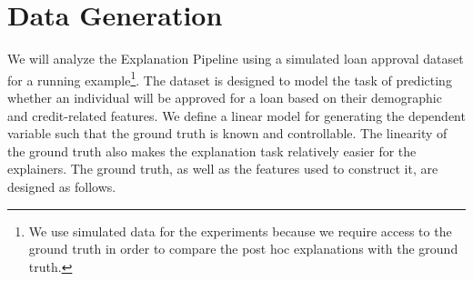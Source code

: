 \documentclass[12pt]{article}  %
\begin{document}

\vspace{-3mm}
\section{Data Generation}
\label{sec:data_generation}\vspace{-3mm}
We will analyze the Explanation Pipeline using a simulated loan approval dataset for a running example\footnote{We use simulated data for the experiments because we require access to the ground truth in order to compare the post hoc explanations with the ground truth.}. The dataset is designed to model the task of predicting whether an individual will be approved for a loan based on their demographic and credit-related features. We define a linear model for generating the dependent variable such that the ground truth is known and controllable. The linearity of the ground truth also makes the explanation task relatively easier for the explainers. The ground truth, as well as the features used to construct it, are designed as follows.
\end{document}
